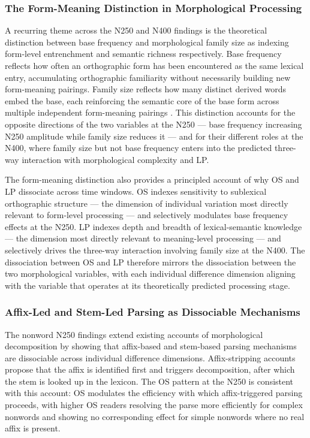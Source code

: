 \documentclass[utf8]{FrontiersinHarvard} %
\begin{document}
	\subsubsection{The Form-Meaning Distinction in Morphological Processing}
	
	A recurring theme across the N250 and N400 findings is the theoretical distinction between base frequency and morphological family size as indexing form-level entrenchment and semantic richness respectively. Base frequency reflects how often an orthographic form has been encountered as the same lexical entry, accumulating orthographic familiarity without necessarily building new form-meaning pairings. Family size reflects how many distinct derived words embed the base, each reinforcing the semantic core of the base form across multiple independent form-meaning pairings \citep{bolgerContextVariationDefinitions2008, liLearningNovelComplex2026}. This distinction accounts for the opposite directions of the two variables at the N250 --- base frequency increasing N250 amplitude while family size reduces it --- and for their different roles at the N400, where family size but not base frequency enters into the predicted three-way interaction with morphological complexity and LP.
	
	The form-meaning distinction also provides a principled account of why OS and LP dissociate across time windows. OS indexes sensitivity to sublexical orthographic structure --- the dimension of individual variation most directly relevant to form-level processing --- and selectively modulates base frequency effects at the N250. LP indexes depth and breadth of lexical-semantic knowledge --- the dimension most directly relevant to meaning-level processing --- and selectively drives the three-way interaction involving family size at the N400. The dissociation between OS and LP therefore mirrors the dissociation between the two morphological variables, with each individual difference dimension aligning with the variable that operates at its theoretically predicted processing stage.
	
	\subsubsection{Affix-Led and Stem-Led Parsing as Dissociable Mechanisms}
	
	The nonword N250 findings extend existing accounts of morphological decomposition by showing that affix-based and stem-based parsing mechanisms are dissociable across individual difference dimensions. Affix-stripping accounts \citep{taft_lexical_1975, rastleMorphologicalDecompositionBased2008} propose that the affix is identified first and triggers decomposition, after which the stem is looked up in the lexicon. The OS pattern at the N250 is consistent with this account: OS modulates the efficiency with which affix-triggered parsing proceeds, with higher OS readers resolving the parse more efficiently for complex nonwords and showing no corresponding effect for simple nonwords where no real affix is present.
	
\end{document}
